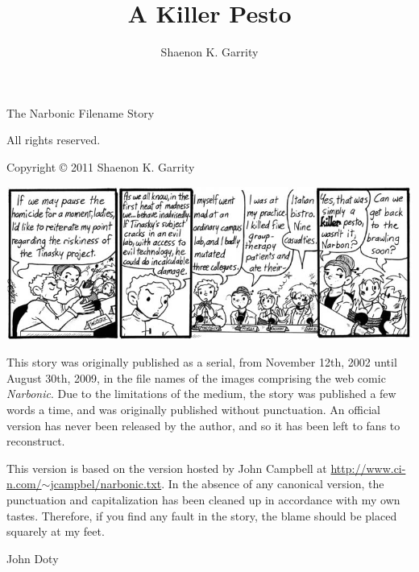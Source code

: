 \documentclass[ebook,10pt]{memoir}
\title{A Killer Pesto}
\author{Shaenon K. Garrity}
\date{}
\begin{document}
\frontmatter 

\pagestyle{empty}
\vspace*{\droptitle}
\begin{flushright}
\Huge \thetitle

\Large The Narbonic Filename Story

\vspace*{20em}
\large \theauthor

\end{flushright}
\newpage

\begin{center}
\vspace*{20em}
All rights reserved.

Copyright \copyright{} 2011 Shaenon K. Garrity
\end{center}

\newpage
\begin{center}
\includegraphics{killer_pesto}
\end{center}

\vspace*{5em}
\small
This story was originally published as a serial, from November 12th,
2002 until August 30th, 2009, in the file names of the images
comprising the web comic \emph{Narbonic}. Due to the limitations of
the medium, the story was published a few words a time, and was
originally published without punctuation. An official version has
never been released by the author, and so it has been left to fans to
reconstruct.

This version is based on the version hosted by John Campbell at 
\mbox{\href{http://www.ci-n.com/~jcampbel/narbonic.txt}{http://www.ci-n.com/$\sim$jcampbel/narbonic.txt}}.
In the absence of any canonical version, the punctuation and 
capitalization has been cleaned up in accordance with my own tastes.
Therefore, if you find any fault in the story, the blame should be 
placed squarely at my feet.

\vspace*{4em}
John Doty
\end{document}
